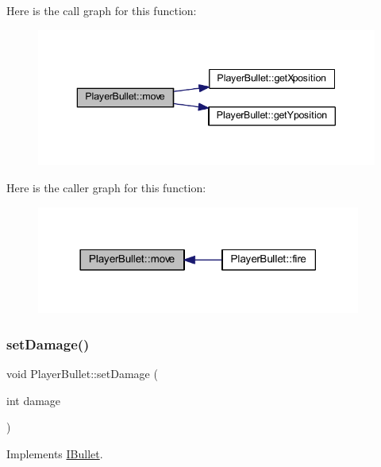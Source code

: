Here is the call graph for this function\+:
\nopagebreak
\begin{figure}[H]
\begin{center}
\leavevmode
\includegraphics[width=343pt]{class_player_bullet_a8469319697d70e04399d8aaac3902c80_cgraph}
\end{center}
\end{figure}
Here is the caller graph for this function\+:
\nopagebreak
\begin{figure}[H]
\begin{center}
\leavevmode
\includegraphics[width=302pt]{class_player_bullet_a8469319697d70e04399d8aaac3902c80_icgraph}
\end{center}
\end{figure}
\mbox{\label{class_player_bullet_a09347ab7665742fc7d492fe26c3a6bce}} 
\subsubsection{\texorpdfstring{set\+Damage()}{setDamage()}}
{\footnotesize\ttfamily void Player\+Bullet\+::set\+Damage (\begin{DoxyParamCaption}\item[{int}]{damage }\end{DoxyParamCaption})\hspace{0.3cm}{\ttfamily [virtual]}}



Implements \hyperlink{class_i_bullet_a072298555accb47f11b84f4c781ae876}{I\+Bullet}.

